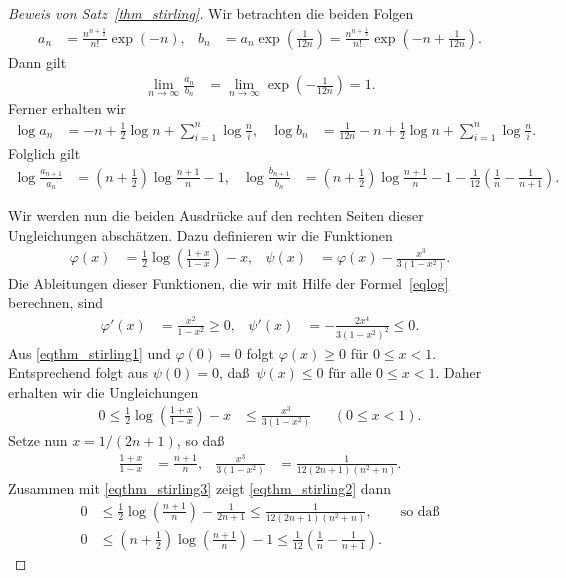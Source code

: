 \documentclass[10pt,reqno]{amsart}
\numberwithin{equation}{section}
\newcommand\bc[1]{\left({#1}\right)}
\newcommand\bcfr[2]{\bc{\frac{#1}{#2}}}
\newcommand\Thm{Satz}
\begin{document}
\begin{proof}[Beweis von \Thm~\ref{thm_stirling}]
	Wir betrachten die beiden Folgen
	\begin{align*}
		a_n&=\frac{n^{n+\frac12}}{n!}\exp(-n),&b_n&=a_n\exp\bcfr1{12n}=\frac{n^{n+\frac12}}{n!}\exp\bc{-n+\frac1{12n}}.
	\end{align*}
	Dann gilt
	\begin{align}\label{eqthm_stirling0}
		\lim_{n\to\infty}\frac{a_n}{b_n}&=\lim_{n\to\infty}\exp\bc{-\frac1{12n}}=1.
	\end{align}
	Ferner erhalten wir 
	\begin{align*}
		\log a_n&=-n+\frac12\log n+\sum_{i=1}^n\log\frac ni,&\log b_n&=\frac1{12n}-n+\frac12\log n+\sum_{i=1}^n\log\frac ni.
	\end{align*}
	Folglich gilt
	\begin{align}\label{eqthm_stirling7}
		\log\frac{a_{n+1}}{a_n}&=\bc{n+\frac12}\log\frac{n+1}n-1,&
		\log\frac{b_{n+1}}{b_n}&=\bc{n+\frac12}\log\frac{n+1}n-1-\frac1{12}\bc{\frac1n-\frac1{n+1}}.
	\end{align}

	Wir werden nun die beiden Ausdr\"ucke auf den rechten Seiten dieser Ungleichungen absch\"atzen.
	Dazu definieren wir die Funktionen
	\begin{align*}
		\varphi(x)&=\frac12\log\bcfr{1+x}{1-x}-x,&\psi(x)&=\varphi(x)-\frac{x^3}{3(1-x^2)}.
	\end{align*}
	Die Ableitungen dieser Funktionen, die wir mit Hilfe der Formel~\eqref{eqlog} berechnen, sind
	\begin{align}\label{eqthm_stirling1}
		\varphi'(x)&=\frac{x^2}{1-x^2}\geq0,&\psi'(x)&=-\frac{2x^4}{3(1-x^2)^2}\leq0.
	\end{align}
	Aus \eqref{eqthm_stirling1} und $\varphi(0)=0$ folgt $\varphi(x)\geq0$ f\"ur $0\leq x<1$.
	Entsprechend folgt aus $\psi(0)=0$, da\ss\ $\psi(x)\leq0$ f\"ur alle $0\leq x<1$.
	Daher erhalten wir die Ungleichungen
	\begin{align}\label{eqthm_stirling2}
		0\leq\frac12\log\bcfr{1+x}{1-x}-x&\leq\frac{x^3}{3(1-x^2)}&&(0\leq x<1).
	\end{align}
	Setze nun $x=1/(2n+1)$, so da\ss\
	\begin{align}\label{eqthm_stirling3}
		\frac{1+x}{1-x}&=\frac{n+1}n,&\frac{x^3}{3(1-x^2)}&=\frac1{12(2n+1)(n^2+n)}.
	\end{align}
	Zusammen mit \eqref{eqthm_stirling3} zeigt \eqref{eqthm_stirling2} dann
	\begin{align}%
		0&\leq\frac12\log\bcfr{n+1}n-\frac1{2n+1}\leq\frac1{12(2n+1)(n^2+n)},\qquad\mbox{so da\ss}\nonumber\\
		0&\leq\bc{n+\frac12}\log\bcfr{n+1}n-1\leq\frac1{12}\bc{\frac1n-\frac1{n+1}}.\label{eqthm_stirling4}
	\end{align}


\end{proof}
\end{document}
